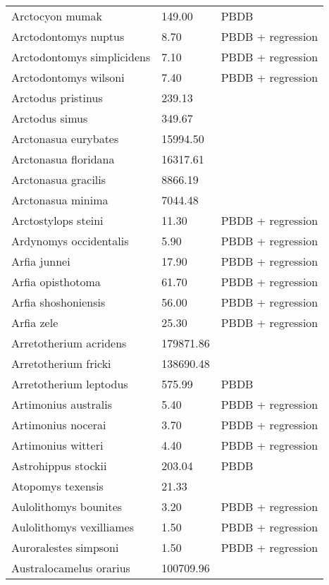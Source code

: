 \begin{longtable}{p{} p{} p{}}
    Arctocyon mumak & 149.00 & PBDB \\ 
    Arctodontomys nuptus & 8.70 & PBDB + regression \\ 
    Arctodontomys simplicidens & 7.10 & PBDB + regression \\ 
    Arctodontomys wilsoni & 7.40 & PBDB + regression \\ 
    Arctodus pristinus & 239.13 & \cite{Smith2004} \\ 
    Arctodus simus & 349.67 & \cite{Smith2004} \\ 
    Arctonasua eurybates & 15994.50 & \cite{Tomiya2013} \\ 
    Arctonasua floridana & 16317.61 & \cite{Tomiya2013} \\ 
    Arctonasua gracilis & 8866.19 & \cite{Tomiya2013} \\ 
    Arctonasua minima & 7044.48 & \cite{Tomiya2013} \\ 
    Arctostylops steini & 11.30 & PBDB + regression \\ 
    Ardynomys occidentalis & 5.90 & PBDB + regression \\ 
    Arfia junnei & 17.90 & PBDB + regression \\ 
    Arfia opisthotoma & 61.70 & PBDB + regression \\ 
    Arfia shoshoniensis & 56.00 & PBDB + regression \\ 
    Arfia zele & 25.30 & PBDB + regression \\ 
    Arretotherium acridens & 179871.86 & \cite{Tomiya2013} \\ 
    Arretotherium fricki & 138690.48 & \cite{Tomiya2013} \\ 
    Arretotherium leptodus & 575.99 & PBDB \\ 
    Artimonius australis & 5.40 & PBDB + regression \\ 
    Artimonius nocerai & 3.70 & PBDB + regression \\ 
    Artimonius witteri & 4.40 & PBDB + regression \\ 
    Astrohippus stockii & 203.04 & PBDB \\ 
    Atopomys texensis & 21.33 & \cite{Tomiya2013} \\ 
    Aulolithomys bounites & 3.20 & PBDB + regression \\ 
    Aulolithomys vexilliames & 1.50 & PBDB + regression \\ 
    Auroralestes simpsoni & 1.50 & PBDB + regression \\ 
    Australocamelus orarius & 100709.96 & \cite{Tomiya2013} \\ 

\end{longtable}
